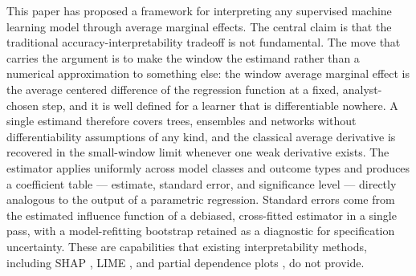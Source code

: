 \documentclass[12pt]{article}
\begin{document}
	This paper has proposed a framework for interpreting any supervised machine learning
	model through average marginal effects. The central claim is that the traditional
	accuracy-interpretability tradeoff is not fundamental. The move that carries the
	argument is to make the window the estimand rather than a numerical approximation to
	something else: the window average marginal effect is the average centered difference of
	the regression function at a fixed, analyst-chosen step, and it is well defined for a
	learner that is differentiable nowhere. A single estimand therefore covers trees,
	ensembles and networks without differentiability assumptions of any kind, and the
	classical average derivative is recovered in the small-window limit whenever one weak
	derivative exists. The estimator applies uniformly across model classes and outcome
	types and produces a coefficient table --- estimate, standard error, and significance
	level --- directly analogous to the output of a parametric regression. Standard errors
	come from the estimated influence function of a debiased, cross-fitted estimator in a
	single pass, with a model-refitting bootstrap retained as a diagnostic for specification
	uncertainty. These are capabilities that existing interpretability methods, including
	SHAP \citep{lundberg2017shap}, LIME \citep{ribeiro2016lime}, and partial dependence
	plots \citep{friedman2001pdp}, do not provide.
	
\end{document}
